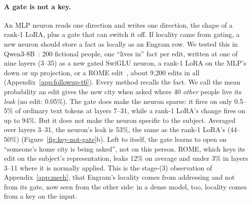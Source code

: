 \documentclass[11pt]{article}
\begin{document}
\paragraph{A gate is not a key.} An MLP neuron reads one direction and
writes one direction, the shape of a rank-1 LoRA, plus a gate that can
switch it off. If locality came from gating, a new neuron should store a
fact as locally as an Engram row. We tested this in
Qwen3-8B~\citep{qwen2025qwen3}: 200 fictional people, one ``lives in''
fact per edit, written at one of nine layers (3--35) as a new gated
SwiGLU neuron, a rank-1 LoRA on the MLP's down or up projection, or a
ROME edit~\citep{meng2022rome}, about 9{,}200 edits in all
(Appendix~\ref{app:followup-t6}). Every method recalls the fact. We
call the mean probability an edit gives the new city when asked where
40 \emph{other} people live its \emph{leak} (no edit: 0.05\%). The gate
does make the neuron sparse: it fires on only 0.5--5\% of ordinary text
tokens at layers 7--31, while a rank-1 LoRA's change fires on up to
94\%. But it does not make the neuron specific to the subject. Averaged
over layers 3--31, the neuron's leak is 53\%, the same as the rank-1
LoRA's (44--50\%) (Figure~\ref{fig:key-not-gate}b). Left to itself,
the gate learns to open on ``someone's home city is being asked'', not
on this person. ROME, which keys its edit on the subject's
representation, leaks 12\% on average and under 3\% in layers 3--11
where it is normally applied. This is the stage-(3) observation of
Appendix~\ref{app:mech}, that Engram's locality comes from addressing
and not from its gate, now seen from the other side: in a dense
model, too, locality comes from a key on the input.
\end{document}
